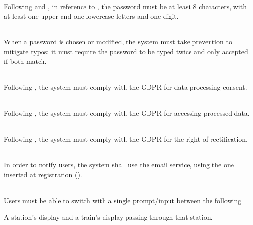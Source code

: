  \\

\noindent Following  and , in reference to , the password must be at least 8 characters, 
with at least one upper and one lowercase letters and one digit.

 \\

\noindent When a password is chosen or modified, the system must take prevention to mitigate typos: it must require the password to be typed twice and only accepted if both match.

 \\

\noindent Following , the system must comply with the GDPR for data processing consent.

 \\

\noindent Following , the system must comply with the GDPR for accessing processed data.

 \\

\noindent Following , the system must comply with the GDPR for the right of rectification.

 \\

\noindent In order to notify users, the system shall use the email service, using the one inserted at registration ().

 \\
Users must be able to switch with a single prompt/input between the following


\noindent A station's display and a train's display passing 
through that station.


